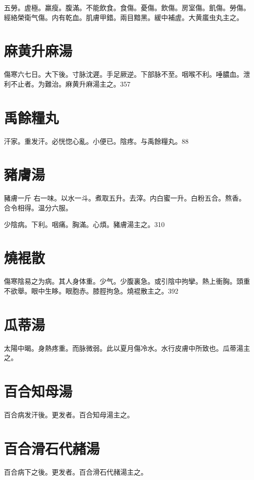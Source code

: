 五勞。虗極。羸瘦。腹滿。不能飲食。食傷。憂傷。飲傷。房室傷。飢傷。勞傷。經絡榮衛气傷。内有乾血。肌膚甲錯。兩目黯黑。緩中補虗。大黄䗪虫丸主之。

\section{麻黄升麻湯}

傷寒六七日。大下後。{\khaaitp 寸}脉沈遲。手足厥逆。下部脉不至。咽喉不利。唾膿血。泄利不止者。为難治。麻黄升麻湯主之。357

\section{禹餘糧丸}

汗家。重发汗。必恍惚心亂。小便已。陰疼。与禹餘糧丸。88

\section{豬膚湯}

豬膚{\scriptsize 一斤}
右一味。以水一斗。煮取五升。去滓。内白蜜一升。白粉五合。熬香。合令相得。温分六服。

少陰病。下利。咽痛。胸滿。心煩。豬膚湯主之。310

\section{燒裩散}

傷寒陰易之为病。其人身体重。少气。少腹裏急。或引陰中拘攣。熱上衝胸。頭重不欲舉。眼中生眵。{\khaaitp 眼胞赤。}膝脛拘急。燒裩散主之。392

\section{瓜蒂湯}

太陽中暍。身熱疼重。而脉微弱。此以夏月傷冷水。水行皮膚中所致也。瓜蒂湯主之。

\section{百合知母湯}

百合病发汗後。更发者。百合知母湯主之。

\section{百合滑石代赭湯}

百合病下之後。更发者。百合滑石代赭湯主之。

